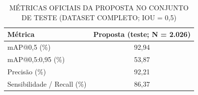 \begin{table}[H]
    \centering
    \caption{MÉTRICAS OFICIAIS DA PROPOSTA NO CONJUNTO DE TESTE (DATASET COMPLETO; IOU = 0,5)}
    \label{tab:metricas_experimentos}
    \begin{tabular}{lc}
        \toprule
        \textbf{Métrica} & \textbf{Proposta (teste; N = 2.026)} \\
        \midrule
        mAP@0,5 (\%) & 92,94 \\
        mAP@0,5:0,95 (\%) & 53,87 \\
        Precisão (\%) & 92,21 \\
        Sensibilidade / Recall (\%) & 86,37 \\
        \bottomrule
    \end{tabular}
\end{table}
